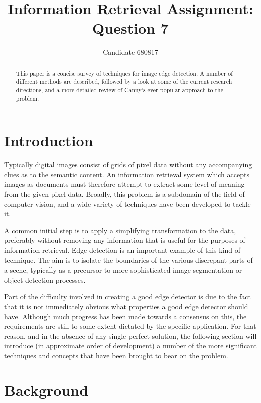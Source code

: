 \documentclass{acm_proc_article-sp}
\begin{document}
\title{Information Retrieval Assignment: Question 7}

\author{
Candidate 680817
}

\maketitle
\begin{abstract}
This paper is a concise survey of techniques for image edge detection. A number
of different methods are described, followed by a look at some of the current
research directions, and a more detailed review of Canny's ever-popular
approach to the problem.
\end{abstract}

\section{Introduction}

Typically digital images consist of grids of pixel data without any
accompanying clues as to the semantic content. An information retrieval system
which accepts images as documents must therefore attempt to extract some level
of meaning from the given pixel data. Broadly, this problem is a subdomain of
the field of computer vision, and a wide variety of techniques have been
developed to tackle it. 

A common initial step is to apply a simplifying transformation to the data,
preferably without removing any information that is useful for the purposes of
information retrieval. Edge detection is an important example of this kind of
technique. The aim is to isolate the boundaries of the various discrepant parts
of a scene, typically as a precursor to more sophisticated image segmentation
or object detection processes.

Part of the difficulty involved in creating a good edge detector is due to the
fact that it is not immediately obvious what properties a good edge detector
should have. Although much progress has been made towards a consensus on this,
the requirements are still to some extent dictated by the specific application.
For that reason, and in the absence of any single perfect solution, the
following section will introduce (in approximate order of development) a number
of the more significant techniques and concepts that have been brought to bear
on the problem.

\section{Background}
\end{document}
